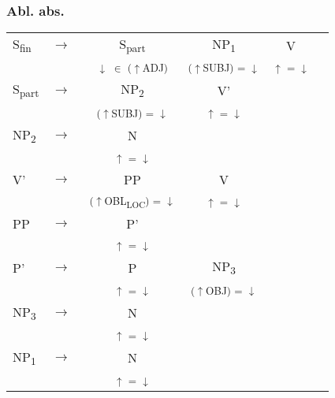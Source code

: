 \documentclass[12pt,a4paper]{article}
\begin{document}
\subsubsection{Abl. abs.}



\begin{singlespace}
\begin{tabular}{ l  l  c  c  c  c }
   S\textsubscript{fin} & $\rightarrow$ & S\textsubscript{part} & NP\textsubscript{1} & V\\
   & $\qquad$ & \textsuperscript{ $\downarrow$ $\in$ ($\uparrow$ADJ)} & \textsuperscript{($\uparrow$SUBJ) = $\downarrow$} & \textsuperscript{$\uparrow$ = $\downarrow$} \\
   S\textsubscript{part} & $\rightarrow$ & NP\textsubscript{2} & V'\\
   & \textsuperscript{$\qquad$} & \textsuperscript{($\uparrow$SUBJ) = $\downarrow$} & \textsuperscript{$\uparrow$ = $\downarrow$} \\
   NP\textsubscript{2} & $\rightarrow$ & N \\
   & $\qquad$ & \textsuperscript{$\uparrow$ = $\downarrow$} \\
   V' & $\rightarrow$ & PP & V & \\
   & $\qquad$ & \textsuperscript{($\uparrow$OBL\textsubscript{LOC}) = $\downarrow$ } & \textsuperscript{$\uparrow$ = $\downarrow$} \\
   PP & $\rightarrow$ & P' \\
	& $\qquad$   & \textsuperscript{$\uparrow$ = $\downarrow$} \\
    P' & $\rightarrow$ & P & NP\textsubscript{3} \\
   & $\qquad$ & \textsuperscript{$\uparrow$ = $\downarrow$} & \textsuperscript{($\uparrow$OBJ) = $\downarrow$} \\
    NP\textsubscript{3} & $\rightarrow$ & N \\
   & $\qquad$ & \textsuperscript{$\uparrow$ = $\downarrow$} \\
   NP\textsubscript{1} & $\rightarrow$ & N \\
   & $\qquad$ & \textsuperscript{$\uparrow$ = $\downarrow$} \\
\end{tabular} 
\end{singlespace}
\end{document}
